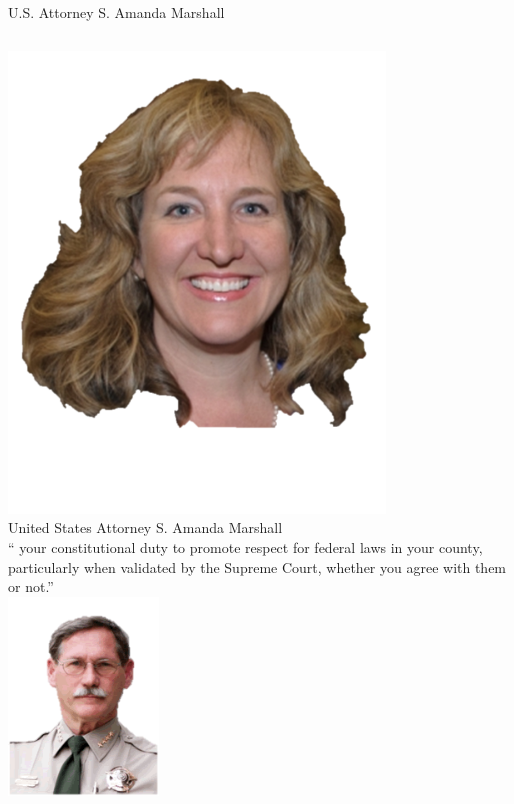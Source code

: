 \documentclass{beamer}
\begin{document}
\begin{frame}{U.S. Attorney S. Amanda Marshall}
    \begin{columns}[onlytextwidth]
            \centering
            \includegraphics[width=0.75\textwidth]{img/amanda-marshall.png} \\
            United States Attorney S. Amanda Marshall \\

            \centering
            `` your constitutional duty to promote respect for federal laws in your county, particularly when validated by the Supreme Court, whether you agree with them or not.'' \\
            \vspace{10pt}
            \includegraphics[width=0.3\textwidth]{img/gil-gilbertson.png} \\
    \end{columns}
\end{frame}
\end{document}
